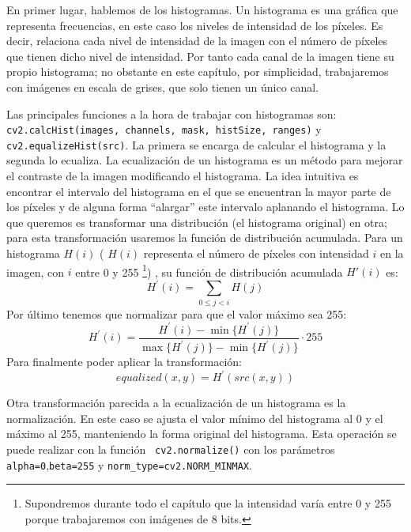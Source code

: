 \documentclass[a4paper,openright, 12pt]{book}
\begin{document}
En primer lugar, hablemos de los histogramas. Un histograma es una gráfica que representa frecuencias, en este caso los niveles de intensidad de los píxeles. Es decir, relaciona cada nivel de intensidad de la imagen con el número de píxeles que tienen dicho nivel de intensidad. Por tanto cada canal de la imagen tiene su propio histograma; no obstante en este capítulo, por simplicidad, trabajaremos con imágenes en escala de grises, que solo  tienen un único canal.

Las principales funciones a la hora de trabajar con histogramas son:
\newline
\lstinline|cv2.calcHist(images, channels, mask, histSize, ranges)| y
\newline\lstinline|cv2.equalizeHist(src)|.
La primera se encarga de calcular el histograma y la segunda lo ecualiza.
La ecualización de un histograma es un método para mejorar el contraste de la imagen modificando el histograma. La idea intuitiva es encontrar el intervalo del histograma en el que se encuentran la mayor parte de los píxeles y de alguna forma ``alargar'' este intervalo aplanando el histograma. Lo que queremos es transformar una distribución (el histograma original) en otra; para esta transformación usaremos la función de distribución acumulada. Para un histograma $H(i)$ ( $H(i)$ representa el número de píxeles con intensidad $i$ en la imagen, con $i$ entre 0 y 255 \footnote{Supondremos durante todo el capítulo que la intensidad varía entre 0 y 255 porque trabajaremos con imágenes de 8 bits.}) , su función de distribución acumulada $H'(i)$ es:
\begin{equation*}
H^{'}(i) = \sum_{0 \le j < i} H(j)
\end{equation*}
Por último tenemos que normalizar para que el valor máximo sea 255:
\begin{equation*}
H^{'}(i) =\frac{H^{'}(i) - \min\{H^{'}(j)\}} {\max\{H^{'}(j)\}-\min\{H^{'}(j)\}} \cdot255
\end{equation*}
Para finalmente poder aplicar la transformación:
\begin{equation*}
equalized( x, y ) = H^{'}( src(x,y) )
\end{equation*}

Otra transformación parecida a la ecualización de un histograma es la normalización. En este caso se ajusta el valor mínimo del histograma al 0 y el máximo al 255, manteniendo la forma original del histograma. Esta operación se puede realizar con la función \lstinline| cv2.normalize()| con los parámetros \lstinline|alpha=0|,\lstinline|beta=255| y \lstinline|norm_type=cv2.NORM_MINMAX|.
\end{document}
